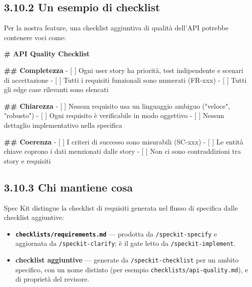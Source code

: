 \documentclass[
  italian,
  10pt,
]{book}
\newenvironment{Shaded}{\begin{snugshade}}{\end{snugshade}}
\newcommand{\FunctionTok}[1]{\textcolor[rgb]{0.13,0.29,0.53}{\textbf{#1}}}
\newcommand{\NormalTok}[1]{#1}
\newcommand{\SpecialStringTok}[1]{\textcolor[rgb]{0.31,0.60,0.02}{#1}}
\newcommand{\VariableTok}[1]{\textcolor[rgb]{0.00,0.00,0.00}{#1}}
\providecommand{\tightlist}{%
  \setlength{\itemsep}{0pt}\setlength{\parskip}{0pt}}
\begin{document}
\subsection{3.10.2 Un esempio di
checklist}\label{un-esempio-di-checklist}

Per la nostra feature, una checklist aggiuntiva di qualità dell'API
potrebbe contenere voci come:

\begin{Shaded}
\begin{Highlighting}[]
\FunctionTok{\# API Quality Checklist}

\FunctionTok{\#\# Completezza}
\SpecialStringTok{{-} }\VariableTok{[ ]}\NormalTok{ Ogni user story ha priorità, test indipendente e scenari di accettazione}
\SpecialStringTok{{-} }\VariableTok{[ ]}\NormalTok{ Tutti i requisiti funzionali sono numerati (FR{-}xxx)}
\SpecialStringTok{{-} }\VariableTok{[ ]}\NormalTok{ Tutti gli edge case rilevanti sono elencati}

\FunctionTok{\#\# Chiarezza}
\SpecialStringTok{{-} }\VariableTok{[ ]}\NormalTok{ Nessun requisito usa un linguaggio ambiguo ("veloce", "robusto")}
\SpecialStringTok{{-} }\VariableTok{[ ]}\NormalTok{ Ogni requisito è verificabile in modo oggettivo}
\SpecialStringTok{{-} }\VariableTok{[ ]}\NormalTok{ Nessun dettaglio implementativo nella specifica}

\FunctionTok{\#\# Coerenza}
\SpecialStringTok{{-} }\VariableTok{[ ]}\NormalTok{ I criteri di successo sono misurabili (SC{-}xxx)}
\SpecialStringTok{{-} }\VariableTok{[ ]}\NormalTok{ Le entità chiave coprono i dati menzionati dalle story}
\SpecialStringTok{{-} }\VariableTok{[ ]}\NormalTok{ Non ci sono contraddizioni tra story e requisiti}
\end{Highlighting}
\end{Shaded}

\subsection{3.10.3 Chi mantiene cosa}\label{chi-mantiene-cosa}

Spec Kit distingue la checklist di requisiti generata nel flusso di
specifica dalle checklist aggiuntive:

\begin{itemize}
\tightlist
\item
  \textbf{\texttt{checklists/requirements.md}} --- prodotta da
  \texttt{/speckit-specify} e aggiornata da \texttt{/speckit-clarify}; è
  il gate letto da \texttt{/speckit-implement}.
\item
  \textbf{checklist aggiuntive} --- generate da
  \texttt{/speckit-checklist} per un ambito specifico, con un nome
  distinto (per esempio \texttt{checklists/api-quality.md}), e di
  proprietà del revisore.
\end{itemize}
\end{document}

